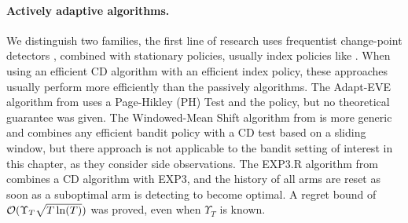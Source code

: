 


\paragraph{Actively adaptive algorithms.}
%
We distinguish two families,
the first line of research uses frequentist change-point detectors \cite{Basseville93}, combined with stationary policies, usually index policies like \UCB.
When using an efficient CD algorithm with an efficient index policy, these approaches usually perform more efficiently than the passively algorithms.
%
The Adapt-EVE algorithm from \cite{Hartland06} uses a Page-Hikley (PH) Test and the \UCB{} policy, but no theoretical guarantee was given.
%
The Windowed-Mean Shift algorithm from \cite{YuMannor09} is more generic and combines any efficient bandit policy with a CD test based on a sliding window, but there approach is not applicable to the bandit setting of interest in this chapter, as they consider side observations.
%
The EXP3.R algorithm from \cite{Allesiardo15,Allesiardo17} combines a CD algorithm with EXP3, and the history of all arms are reset as soon as a suboptimal arm is detecting to become optimal.
A regret bound of $\mathcal{O}(\Upsilon_T \sqrt{T \ln(T)})$ was proved, even when $\Upsilon_T$ is known.

